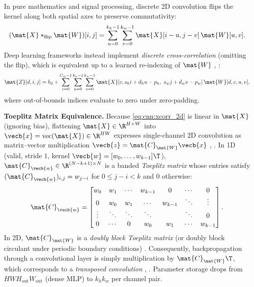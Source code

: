 \documentclass[../../../../master.tex]{subfiles}
\begin{document}
\begin{coremath}
\label{box:cnn:toeplitz}
In pure mathematics and signal processing, discrete 2D convolution flips the kernel along both spatial axes to preserve commutativity:
\begin{equation}
\label{eq:cnn:true_conv}
(\mat{X} *_{\mathrm{flip}} \mat{W})[i, j] = \sum_{u=0}^{k_h - 1} \sum_{v=0}^{k_w - 1} \mat{X}[i - u, j - v]\, \mat{W}[u, v].
\end{equation}
Deep learning frameworks instead implement \emph{discrete cross-correlation} (omitting the flip), which is equivalent up to a learned re-indexing of $\mat{W}$ , :
\begin{equation}
\label{eq:cnn:xcorr_2d}
\mat{Z}[d, i, j] = b_d + \sum_{c=0}^{C_{\mathrm{in}}-1} \sum_{u=0}^{k_h - 1} \sum_{v=0}^{k_w - 1} \mat{X}[c, s_h i + d_h u - p_h,\; s_w j + d_w v - p_w]\, \mat{W}[d, c, u, v],
\end{equation}
where out-of-bounds indices evaluate to zero under zero-padding.

\textbf{Toeplitz Matrix Equivalence.} Because \eqref{eq:cnn:xcorr_2d} is linear in $\mat{X}$ (ignoring bias), flattening $\mat{X} \in \R^{H \times W}$ into $\vecb{x} = \mathrm{vec}(\mat{X}) \in \R^{HW}$ expresses single-channel 2D convolution as matrix--vector multiplication $\vecb{z} = \mat{C}_{\mat{W}} \vecb{x}$ , . In 1D (valid, stride $1$, kernel $\vecb{w} = [w_0, \dots, w_{k-1}]\T$), $\mat{C}_{\vecb{w}} \in \R^{(N - k + 1) \times N}$ is a banded \emph{Toeplitz matrix} whose entries satisfy $(\mat{C}_{\vecb{w}})_{i, j} = w_{j - i}$ for $0 \le j - i < k$ and $0$ otherwise:
\begin{equation}
\label{eq:cnn:toeplitz_matrix}
\mat{C}_{\vecb{w}} =
\begin{bmatrix}
w_0 & w_1 & \cdots & w_{k-1} & 0 & \cdots & 0 \\
0 & w_0 & w_1 & \cdots & w_{k-1} & \ddots & \vdots \\
\vdots & \ddots & \ddots & \ddots & & \ddots & 0 \\
0 & \cdots & 0 & w_0 & w_1 & \cdots & w_{k-1}
\end{bmatrix}.
\end{equation}
In 2D, $\mat{C}_{\mat{W}}$ is a \emph{doubly block Toeplitz matrix} (or doubly block circulant under periodic boundary conditions) . Consequently, backpropagation through a convolutional layer is simply multiplication by $\mat{C}_{\mat{W}}\T$, which corresponds to a \emph{transposed convolution} , . Parameter storage drops from $H W H_{\mathrm{out}} W_{\mathrm{out}}$ (dense MLP) to $k_h k_w$ per channel pair.
\end{coremath}
\end{document}
